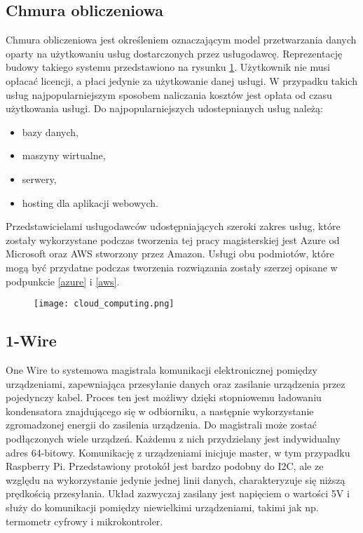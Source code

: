 \subsection{Chmura obliczeniowa}
Chmura obliczeniowa jest określeniem oznaczającym model przetwarzania danych oparty na użytkowaniu usług dostarczonych przez usługodawcę. Reprezentację budowy takiego systemu przedstawiono na rysunku \ref{fig:chmura_obliczeniowa}. Użytkownik nie musi opłacać licencji, a płaci jedynie za użytkowanie danej usługi. W przypadku takich usług najpopularniejszym sposobem naliczania kosztów jest opłata od czasu użytkowania usługi.
Do najpopularniejszych udostepnianych usług należą:
\begin{itemize}
\item bazy danych,
\item maszyny wirtualne,
\item serwery,
\item hosting dla aplikacji webowych.
\end{itemize}
Przedstawicielami usługodawców udostępniających szeroki zakres usług, które zostały wykorzystane podczas tworzenia tej pracy magisterskiej jest Azure od Microsoft oraz AWS stworzony przez Amazon. Usługi obu podmiotów, które mogą być przydatne podczas tworzenia rozwiązania zostały szerzej opisane w podpunkcie \ref{azure} i \ref{aws}.
\begin{figure}[H]
	\centering
	\texttt{[image: cloud\_computing.png]}
	\label{fig:chmura_obliczeniowa}
\end{figure}
\subsection{1-Wire} \label{1wire}
One Wire to systemowa magistrala komunikacji elektronicznej pomiędzy urządzeniami, zapewniająca przesyłanie danych oraz zasilanie urządzenia przez pojedynczy kabel. Proces ten jest możliwy dzięki stopniowemu ładowaniu kondensatora znajdującego się w odbiorniku, a następnie wykorzystanie zgromadzonej energii do zasilenia urządzenia. Do magistrali może zostać podłączonych wiele urządzeń. Każdemu z nich przydzielany jest indywidualny adres 64-bitowy. Komunikację z urządzeniami inicjuje master, w tym przypadku Raspberry Pi.
Przedstawiony protokół jest bardzo podobny do I2C, ale ze względu na wykorzystanie jedynie jednej linii danych, charakteryzuje się niższą prędkością przesyłania. Układ zazwyczaj zasilany jest napięciem o wartości 5V i służy do komunikacji pomiędzy niewielkimi urządzeniami, takimi jak np. termometr cyfrowy i mikrokontroler.

